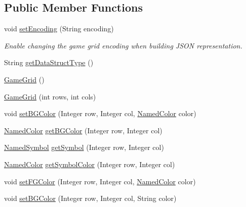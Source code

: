 \subsection*{Public Member Functions}
\begin{DoxyCompactItemize}
\item 
void \mbox{\hyperlink{classbridges_1_1base_1_1_game_grid_a2281cfd7d61dc9903c9b1358c9767a1e}{set\+Encoding}} (String encoding)
\begin{DoxyCompactList}\small\item\em Enable changing the game grid encoding when building J\+S\+ON representation. \end{DoxyCompactList}\item 
String \mbox{\hyperlink{classbridges_1_1base_1_1_game_grid_a4d88979ac0f74f212392c5efe1400916}{get\+Data\+Struct\+Type}} ()
\item 
\mbox{\hyperlink{classbridges_1_1base_1_1_game_grid_a0b5330e66b504eddc00617c5f1fa6240}{Game\+Grid}} ()
\item 
\mbox{\hyperlink{classbridges_1_1base_1_1_game_grid_acfe6d52979dae94b1d883fed4965feb3}{Game\+Grid}} (int rows, int cols)
\item 
void \mbox{\hyperlink{classbridges_1_1base_1_1_game_grid_a72d7d5b03b78fdc4110cee955727a523}{set\+B\+G\+Color}} (Integer row, Integer col, \mbox{\hyperlink{enumbridges_1_1base_1_1_named_color}{Named\+Color}} color)
\item 
\mbox{\hyperlink{enumbridges_1_1base_1_1_named_color}{Named\+Color}} \mbox{\hyperlink{classbridges_1_1base_1_1_game_grid_abf8435b464054c1f290985b05ce7cd97}{get\+B\+G\+Color}} (Integer row, Integer col)
\item 
\mbox{\hyperlink{enumbridges_1_1base_1_1_named_symbol}{Named\+Symbol}} \mbox{\hyperlink{classbridges_1_1base_1_1_game_grid_a974e33d5561a8f214966be626a9ca8ca}{get\+Symbol}} (Integer row, Integer col)
\item 
\mbox{\hyperlink{enumbridges_1_1base_1_1_named_color}{Named\+Color}} \mbox{\hyperlink{classbridges_1_1base_1_1_game_grid_ab094ebfd585aac9440836ad6875ce094}{get\+Symbol\+Color}} (Integer row, Integer col)
\item 
void \mbox{\hyperlink{classbridges_1_1base_1_1_game_grid_a105b46f68bcc9413889e7255318bab4c}{set\+F\+G\+Color}} (Integer row, Integer col, \mbox{\hyperlink{enumbridges_1_1base_1_1_named_color}{Named\+Color}} color)
\item 
void \mbox{\hyperlink{classbridges_1_1base_1_1_game_grid_ad655bef3f2c24cc19f222b86b5d31373}{set\+B\+G\+Color}} (Integer row, Integer col, String color)

\end{DoxyCompactItemize}
